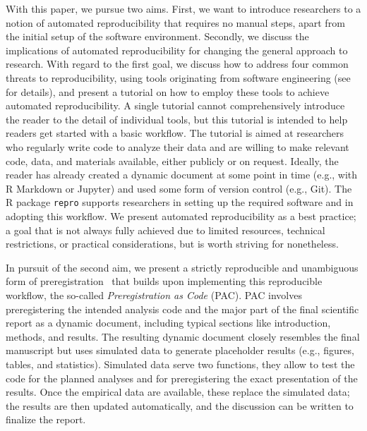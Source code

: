 \documentclass[psych,tutorial,accept,moreauthors,pdftex]{Definitions/mdpi}
\begin{document}
With this paper, we pursue two aims. First, we want to introduce
researchers to a notion of automated reproducibility that requires no
manual steps, apart from the initial setup of the software environment.
Secondly, we discuss the implications of automated reproducibility for
changing the general approach to research. With regard to the first
goal, we discuss how to address four common threats to reproducibility,
using tools originating from software engineering (see~\citep{Peikert2019} for
details), and present a tutorial on how to employ these
tools to achieve automated reproducibility. A single tutorial cannot
comprehensively introduce the reader to the detail of individual tools,
but this tutorial is intended to help readers get started with a basic
workflow. The tutorial is aimed at researchers who regularly write code
to analyze their data and are willing to make relevant code, data, and
materials available, either publicly or on request. Ideally, the reader
has already created a dynamic document at some point in time (e.g., with
R Markdown or Jupyter) and used some form of version control (e.g.,
Git). The R package \texttt{repro} supports researchers in setting up
the required software and in adopting this workflow. We present
automated reproducibility as a best practice; a goal that is not always
fully achieved due to limited resources, technical restrictions, or
practical considerations, but is worth striving for nonetheless.

In pursuit of the second aim, we present a strictly reproducible and
unambiguous form of preregistration~\citep{NosekRevolution2018} that
builds upon implementing this reproducible workflow, the so-called
\emph{Preregistration as Code} (PAC). PAC involves preregistering the
intended analysis code and the major part of the final scientific report
as a dynamic document, including typical sections like introduction,
methods, and results. The resulting dynamic document closely resembles
the final manuscript but uses simulated data to generate placeholder
results (e.g., figures, tables, and statistics). Simulated data serve
two functions, they allow to test the code for the planned analyses and
for preregistering the exact presentation of the results. Once the
empirical data are available, these replace the simulated data; the
results are then updated automatically, and the discussion can be
written to finalize the report.
\end{document}
